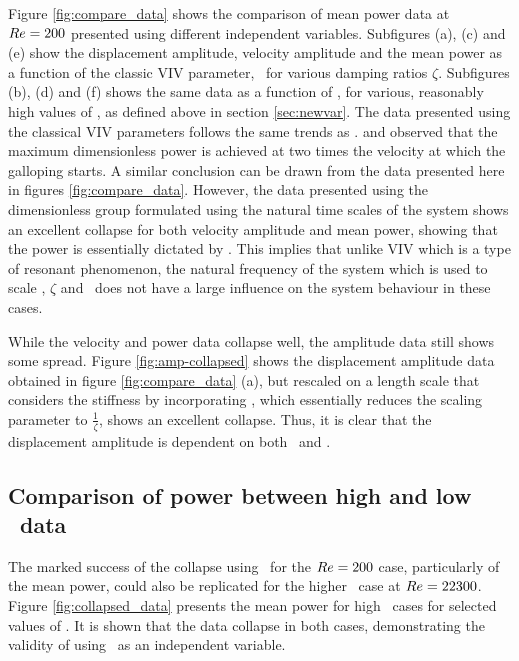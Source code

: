  
 Figure \ref{fig:compare_data} shows the comparison of mean power data at $Re=200$ presented using different independent variables. Subfigures (a), (c) and (e) show the displacement amplitude, velocity amplitude and the mean power as a function of the classic VIV parameter, \ustar \ for various damping ratios $\zeta$. Subfigures (b), (d) and (f) shows the same data as a function of \massdamp, for various, reasonably high values of \massstiff, as defined above in section \ref{sec:newvar}. The data presented using the classical VIV parameters follows the same trends as \cite{Barrero-Gil2010a}. \citet{Barrero-Gil2010a} and \citet{vicente-Ludlam2014} observed that the maximum dimensionless power is achieved at two times the velocity at which the galloping starts. A similar conclusion can be drawn from the data presented here in figures \ref{fig:compare_data}. However, the data presented using the dimensionless group formulated using the natural time scales of the system shows an excellent collapse for both velocity amplitude and mean power, showing that the power is essentially dictated by \massdamp. This implies that unlike VIV which is a type of resonant phenomenon, the natural frequency of the system which is used to scale \ustar, $\zeta$ and \massstiff\ does not have a large influence on the system behaviour in these cases.
 
 
 
 
  
  
 
While the velocity and power data collapse well, the amplitude data still shows some spread. Figure \ref{fig:amp-collapsed} shows the displacement amplitude data obtained in figure \ref{fig:compare_data} (a), but rescaled on a length scale that considers the stiffness by incorporating \massstiff, which essentially reduces the scaling parameter to $\frac{1}{\zeta}$, shows an excellent collapse. Thus, it is clear that the displacement amplitude is dependent on both \massstiff\ and \massdamp.    


 \subsection{Comparison of power between high and low \reynoldsnumber\ data}   

\label{sec:low_vs_high_re}
The marked success of the collapse using \massdamp\ for the $Re = 200$ case, particularly of the mean power, could also be replicated for the higher \reynoldsnumber\ case at $Re = 22300$. Figure \ref{fig:collapsed_data} presents the mean power for high \reynoldsnumber\ cases for selected values of \massstiff. It is shown that the data collapse in both cases, demonstrating the validity of using \massdamp\ as an independent variable.


